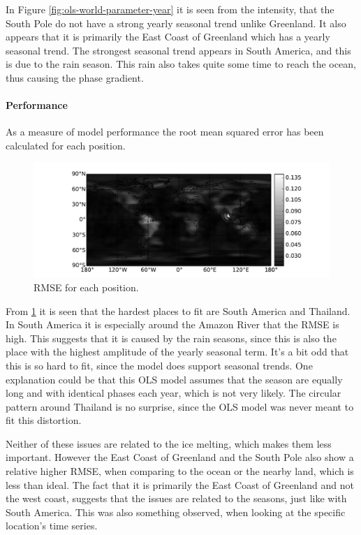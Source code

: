 In Figure \ref{fig:ols-world-parameter-year} it is seen from the intensity, that the South Pole do not have a strong yearly seasonal trend unlike Greenland. It also appears that it is primarily the East Coast of Greenland which has a yearly seasonal trend. The strongest seasonal trend appears in South America, and this is due to the rain season. This rain also takes quite some time to reach the ocean, thus causing the phase gradient.

\paragraph{Performance} 

As a measure of  model performance the root mean squared error has been calculated for each position.
\begin{figure}[H]
	\centering
	\includegraphics[width=\textwidth]{figures/ols-world-performance-rmse}
	\caption{RMSE for each position.}
	\label{fig:ols-world-performance-rmse}
\end{figure}

From \ref{fig:ols-world-performance-rmse} it is seen that the hardest places to fit are South America and Thailand. In South America it is especially around the Amazon River that the RMSE is high. This suggests that it is caused by the rain seasons, since this is also the place with the highest amplitude of the yearly seasonal term. It's a bit odd that this is so hard to fit, since the model does support seasonal trends. One explanation could be that this OLS model assumes that the season are equally long and with identical phases each year, which is not very likely. The circular pattern around Thailand is no surprise, since the OLS model was never meant to fit this distortion.

Neither of these issues are related to the ice melting, which makes them less important. However the East Coast of Greenland and the South Pole also show a relative higher RMSE, when comparing to the ocean or the nearby land, which is less than ideal. The fact that it is primarily the East Coast of Greenland and not the west coast, suggests that the issues are related to the seasons, just like with South America. This was also something observed, when looking at the specific location's time series.

